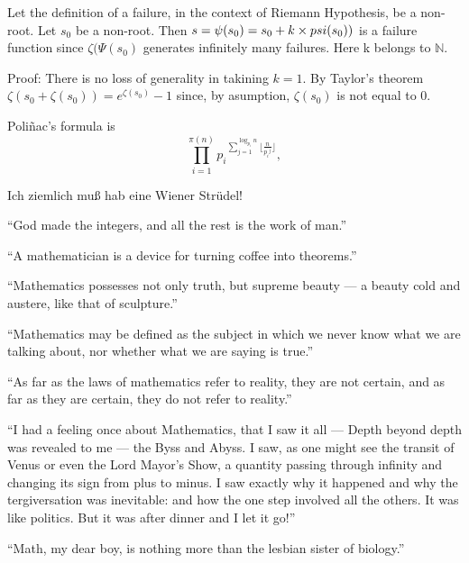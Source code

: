 \documentclass[12pt]{article}
\begin{document}
Let the definition of a failure, in the context of Riemann Hypothesis, be a non-root. Let $s_0$ be a non-root. Then $s = \psi (s_0) = s_0 + k\times\\psi(s_0))$ is a failure function since $\zeta(\Psi(s_0)$ generates infinitely many failures. Here k belongs to $\mathbb{N}.$

Proof: There is no loss of generality in takining $k = 1$. By Taylor's theorem $\zeta(s_0 + \zeta(s_0)) = e^{\zeta(s_0)} - 1$ since, by asumption, $\zeta(s_0)$ is not equal to $0$.


Poli\~nac's formula is $$\prod_{i = 1}^{\pi(n)} {p_i}^{\displaystyle \sum_{j = 1}^{\log_{p_i} n} \lfloor \frac{n}{{p_i}^j} \rfloor},$$

Ich ziemlich mu\ss{} hab eine Wiener Str\"udel!

``God made the integers, and all the rest is the work of man.''\\

``A mathematician is a device for turning coffee into theorems.''\\

``Mathematics possesses not only truth, but supreme beauty --- a beauty cold and austere, like that of sculpture.''\\

``Mathematics may be defined as the subject in which we never know what we are talking about, nor whether what we are saying is true.''\\

``As far as the laws of mathematics refer to reality, they are not certain, and as far as they are certain, they do not refer to reality.''\\

``I had a feeling once about Mathematics, that I saw it all --- Depth beyond depth was revealed to me --- the Byss and Abyss. I saw, as one might see the transit of Venus or even the Lord Mayor's Show, a quantity passing through infinity and changing its sign from plus to minus. I saw exactly why it happened and why the tergiversation was inevitable: and how the one step involved all the others. It was like politics. But it was after dinner and I let it go!''\\

``Math, my dear boy, is nothing more than the lesbian sister of biology.''\\
\end{document}
